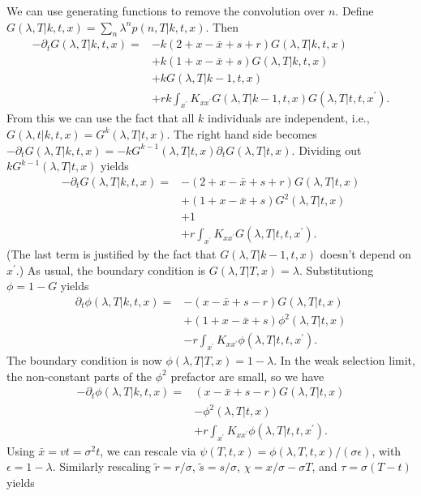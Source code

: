 \documentclass[10pt]{revtex4}
\begin{document}
We can use generating functions to remove the convolution over $n$. Define $G(\lambda, T|k,t,x) = \sum_n \lambda^n p(n,T|k,t,x)$. Then
\begin{align*}
-\partial_t G(\lambda,T|k,t,x) = &-k(2+x-\bar{x}+s+r)G(\lambda,T|k,t,x) \\
& + k(1+x-\bar{x}+s)G(\lambda,T|k,t,x) \\
& + kG(\lambda,T|k-1,t,x) \\
& + rk\int_{x^\prime} K_{x x^\prime} G(\lambda, T|k-1, t, x) G(\lambda,T|t,t,x^\prime).
\end{align*}
From this we can use the fact that all $k$ individuals are independent, i.e., $G(\lambda,t|k,t,x) = G^k(\lambda,T|t,x)$.
The right hand side becomes $-\partial_t G(\lambda,T|k,t,x) = -kG^{k-1}(\lambda,T|t,x)\partial_t G(\lambda,T|t,x)$. Dividing out $kG^{k-1}(\lambda,T|t,x)$ yields
\begin{align*}
-\partial_t G(\lambda,T|k,t,x) = &-(2+x-\bar{x}+s+r)G(\lambda,T|t,x) \\
& + (1+x-\bar{x}+s)G^2(\lambda,T|t,x) \\
& + 1 \\
& + r\int_{x^\prime} K_{x x^\prime} G(\lambda,T|t,t,x^\prime).
\end{align*}
(The last term is justified by the fact that $G(\lambda,T|k-1,t,x)$ doesn't depend on $x^\prime$.)
As usual, the boundary condition is $G(\lambda,T|T,x) = \lambda$.
Substitutiong $\phi = 1 - G$ yields
\begin{align*}
\partial_t \phi(\lambda,T|k,t,x) = &-(x-\bar{x}+s-r)G(\lambda,T|t,x) \\
& + (1+x-\bar{x}+s)\phi^2(\lambda,T|t,x) \\
& - r\int_{x^\prime} K_{x x^\prime} \phi(\lambda,T|t,t,x^\prime).
\end{align*}
The boundary condition is now $\phi(\lambda,T|T,x) = 1-\lambda$.
In the weak selection limit, the non-constant parts of the $\phi^2$ prefactor are small, so we have
\begin{align*}
-\partial_t \phi(\lambda,T|k,t,x) = &(x-\bar{x}+s-r)G(\lambda,T|t,x) \\
& - \phi^2(\lambda,T|t,x) \\
& + r\int_{x^\prime} K_{x x^\prime} \phi(\lambda,T|t,t,x^\prime).
\end{align*}
Using $\bar{x} = vt = \sigma^2 t$, we can rescale via $\psi(T,t,x) = \phi(\lambda,T,t,x)/(\sigma\epsilon)$, with $\epsilon = 1-\lambda$.
Similarly rescaling $\tilde{r} = r/\sigma$, $\tilde{s} = s/\sigma$, $\chi = x/\sigma - \sigma T$, and $\tau = \sigma(T-t)$ yields
\end{document}
